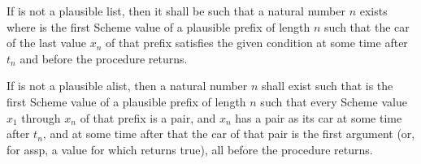 \begin{entry}{%
}


If  is not a plausible list, then it shall be such that a
natural number $n$ exists where  is the first Scheme value of a
plausible prefix of length $n$ such that
the car of the last value $x_n$ of that
prefix satisfies the given condition at some time after $t_n$ and before
the procedure returns.
\end{entry}

\begin{entry}{%
}


If  is not a plausible alist, then a natural number $n$ shall
exist such that  is the first Scheme value of a plausible
prefix of length $n$ such that every Scheme value $x_1$ through $x_n$
of that prefix is a pair, and $x_n$ has a pair as its car at some time
after $t_n$, and at some time after that the car of that pair is the
first argument (or, for {\cf assp}, a value for which 
returns true), all before the procedure returns.
\end{entry}

